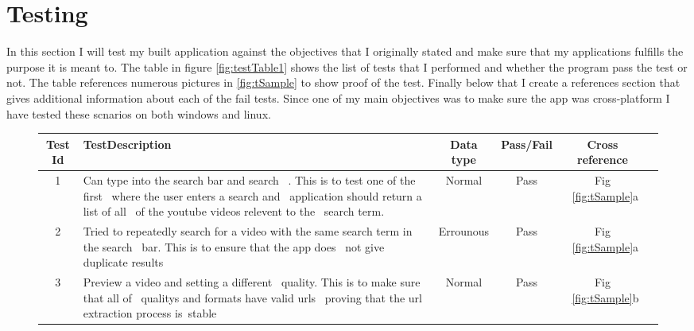 \documentclass{article}
\begin{document}
\section{Testing}
In this section I will test my built application against the objectives that I originally stated and make sure
that my applications fulfills the purpose it is meant to. The table in figure \ref{fig:testTable1} shows the list
of tests that I performed and whether the program pass the test or not. The table references numerous pictures
in \ref{fig:tSample} to show proof of the test. Finally below that I create a references section that gives
additional information about each of the fail tests. Since one of my main objectives was to make sure the app
was cross-platform I have tested these scnarios on both windows and linux.
\begin{figure}[H]
    \begin{center}
        \begin{tabular} { | c | p{5cm} | c | c | c | c |}
            \hline
            \textbf{Test Id}&         \textbf{TestDescription}         &   \textbf{Data type}   &\textbf{Pass/Fail}& \textbf{Cross reference}\\ \hline
            1               &Can type into the search bar and search   \
                             . This is to test one of the first        \
                             where the user enters a search and        \
                             application should return a list of all   \
                             of the youtube videos relevent to the     \
                             search term.                              &      Normal            &       Pass       & Fig ~\ref{fig:tSample}a \\ \hline
            2               &Tried to repeatedly search for a video
                             with the same search term in the search   \
                             bar. This is to ensure that the app does  \
                             not give duplicate results                &      Errounous         &       Pass       & Fig ~\ref{fig:tSample}a \\ \hline
            3               &Preview a video and setting a different   \
                             quality. This is to make sure that all of \
                             qualitys and formats have valid urls      \
                             proving that the url extraction process is\
                             stable                                    &      Normal            &       Pass       & Fig ~\ref{fig:tSample}b \\ \hline

\end{tabular}
\end{center}
\end{figure}
\end{document}
